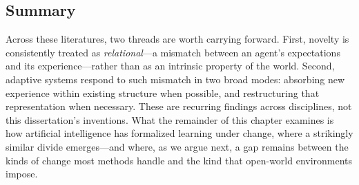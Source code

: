 \subsection{Summary}
\label{sec:novelty_perspectives_summary}

Across these literatures, two threads are worth carrying forward. First, novelty is consistently treated as \emph{relational}---a mismatch between an agent's expectations and its experience---rather than as an intrinsic property of the world. Second, adaptive systems respond to such mismatch in two broad modes: absorbing new experience within existing structure when possible, and restructuring that representation when necessary. These are recurring findings across disciplines, not this dissertation's inventions. What the remainder of this chapter examines is how artificial intelligence has formalized learning under change, where a strikingly similar divide emerges---and where, as we argue next, a gap remains between the kinds of change most methods handle and the kind that open-world environments impose.

